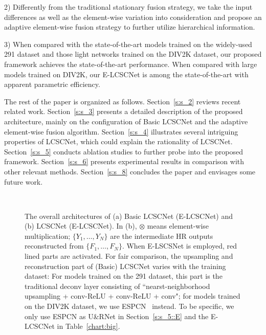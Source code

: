 \documentclass[journal]{IEEEtran}
\begin{document}
2) Differently from the traditional stationary fusion strategy, we take the input differences as well as the element-wise variation into consideration and propose an adaptive element-wise fusion strategy to further utilize hierarchical information.

3) When compared with the state-of-the-art models trained on the widely-used 291 dataset and those light networks trained on the DIV2K dataset, our proposed framework achieves the state-of-the-art performance. When compared with large models trained on DIV2K, our E-LCSCNet is among the state-of-the-art with apparent parametric efficiency.  


The rest of the paper is organized as follows. Section~\ref{s:s_2} reviews recent related work. Section~\ref{s:s_3} presents a detailed description of the proposed architecture, mainly on the configuration of Basic LCSCNet and the adaptive element-wise fusion algorithm. Section~\ref{s:s_4} illustrates several intriguing properties of LCSCNet, which could explain the rationality of LCSCNet. Section~\ref{s:s_5} conducts ablation studies to further probe into the proposed framework. Section~\ref{s:s_6} presents experimental results in comparison with other relevant methods. 
Section~\ref{s:s_8} concludes the paper and envisages some future work. 




\begin{figure*}[htbp]
\centering
{} \\
\caption{\small The overall architectures of (a) Basic LCSCNet (E-LCSCNet) and (b) LCSCNet (E-LCSCNet). In (b), $\otimes$ means element-wise multiplication; $\{Y_{1},\dots,Y_{N}\}$ are the intermediate HR outputs reconstructed from $\{F_{1},\dots,F_{N}\}$. When E-LSCSNet is employed, red lined parts are activated. For fair comparison, the upsampling and reconstruction part of (Basic) LCSCNet varies with the training dataset: For models trained on the 291 dataset, this part is the traditional deconv layer consisting of ``nearst-neighborhood upsampling + conv-ReLU + conv-ReLU + conv"; for models trained on the DIV2K dataset, we use ESPCN~\cite{shi2016real} instead. To be specific, we only use ESPCN as U\&RNet in Section~\ref{s:s_5::E} and the E-LCSCNet in Table~\ref{chart:big}.}
\label{fig:F3}
\end{figure*} 
\end{document}
